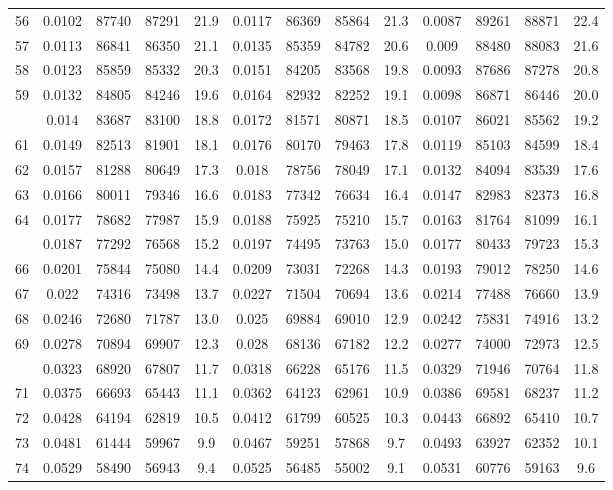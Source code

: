 \documentclass[
  14pt,
]{article}
\begin{document}
\begin{longtable}[t]{lcccccccccccc}
56 & 0.0102 & 87740 & 87291 & 21.9 & 0.0117 & 86369 & 85864 & 21.3 & 0.0087 & 89261 & 88871 & 22.4\\
57 & 0.0113 & 86841 & 86350 & 21.1 & 0.0135 & 85359 & 84782 & 20.6 & 0.009 & 88480 & 88083 & 21.6\\
58 & 0.0123 & 85859 & 85332 & 20.3 & 0.0151 & 84205 & 83568 & 19.8 & 0.0093 & 87686 & 87278 & 20.8\\
59 & 0.0132 & 84805 & 84246 & 19.6 & 0.0164 & 82932 & 82252 & 19.1 & 0.0098 & 86871 & 86446 & 20.0\\
\addlinespace
60 & 0.014 & 83687 & 83100 & 18.8 & 0.0172 & 81571 & 80871 & 18.5 & 0.0107 & 86021 & 85562 & 19.2\\
61 & 0.0149 & 82513 & 81901 & 18.1 & 0.0176 & 80170 & 79463 & 17.8 & 0.0119 & 85103 & 84599 & 18.4\\
62 & 0.0157 & 81288 & 80649 & 17.3 & 0.018 & 78756 & 78049 & 17.1 & 0.0132 & 84094 & 83539 & 17.6\\
63 & 0.0166 & 80011 & 79346 & 16.6 & 0.0183 & 77342 & 76634 & 16.4 & 0.0147 & 82983 & 82373 & 16.8\\
64 & 0.0177 & 78682 & 77987 & 15.9 & 0.0188 & 75925 & 75210 & 15.7 & 0.0163 & 81764 & 81099 & 16.1\\
\addlinespace
65 & 0.0187 & 77292 & 76568 & 15.2 & 0.0197 & 74495 & 73763 & 15.0 & 0.0177 & 80433 & 79723 & 15.3\\
66 & 0.0201 & 75844 & 75080 & 14.4 & 0.0209 & 73031 & 72268 & 14.3 & 0.0193 & 79012 & 78250 & 14.6\\
67 & 0.022 & 74316 & 73498 & 13.7 & 0.0227 & 71504 & 70694 & 13.6 & 0.0214 & 77488 & 76660 & 13.9\\
68 & 0.0246 & 72680 & 71787 & 13.0 & 0.025 & 69884 & 69010 & 12.9 & 0.0242 & 75831 & 74916 & 13.2\\
69 & 0.0278 & 70894 & 69907 & 12.3 & 0.028 & 68136 & 67182 & 12.2 & 0.0277 & 74000 & 72973 & 12.5\\
\addlinespace
70 & 0.0323 & 68920 & 67807 & 11.7 & 0.0318 & 66228 & 65176 & 11.5 & 0.0329 & 71946 & 70764 & 11.8\\
71 & 0.0375 & 66693 & 65443 & 11.1 & 0.0362 & 64123 & 62961 & 10.9 & 0.0386 & 69581 & 68237 & 11.2\\
72 & 0.0428 & 64194 & 62819 & 10.5 & 0.0412 & 61799 & 60525 & 10.3 & 0.0443 & 66892 & 65410 & 10.7\\
73 & 0.0481 & 61444 & 59967 & 9.9 & 0.0467 & 59251 & 57868 & 9.7 & 0.0493 & 63927 & 62352 & 10.1\\
74 & 0.0529 & 58490 & 56943 & 9.4 & 0.0525 & 56485 & 55002 & 9.1 & 0.0531 & 60776 & 59163 & 9.6\\

\end{longtable}
\end{document}
